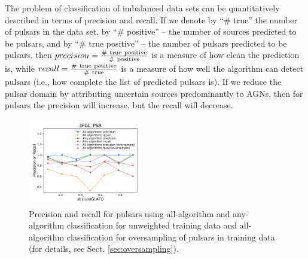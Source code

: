\documentclass[referee]{aa} %
\newcommand{\twopicsp}{0.45}
\begin{document}
The problem of classification of imbalanced data sets can be quantitatively described in terms of precision and recall.
If we denote by ``\# true'' the number of pulsars in the data set, by ``\# positive'' -- the number of sources predicted to be pulsars, and by 
``\# true positive'' -- the number of pulsars predicted to be pulsars, then  $precision \rm = \frac{\#\ true\ positive}{\#\ positive}$ is a measure of how clean the prediction is, while $recall \rm = \frac{\#\ true\ positive}{\#\ true}$ is a measure of how well the algorithm can detect pulsars (i.e., how complete the list of predicted pulsars is).
If we reduce the pulsar domain by attributing uncertain sources predominantly to AGNs, then for pulsars the precision will increase, but the recall will decrease.



\begin{figure}[h]
\centering
\includegraphics[width=\twopicsp\textwidth]{plots/all_algs_3FGL_precision_recall_oversample_PSR.pdf}
\caption{Precision and recall for pulsars using all-algorithm and any-algorithm classification for unweighted training data and
all-algorithm classification for oversampling of pulsars in training data (for details, see Sect. \ref{sec:oversampling}).}
\label{fig:prec_recall}
\end{figure}
\end{document}
